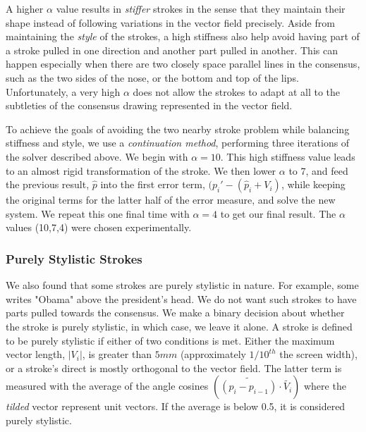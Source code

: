 A higher $\alpha$ value results in {\em stiffer} strokes in the sense that they maintain their shape instead of following variations in the vector field precisely. Aside from maintaining the {\em style} of the strokes, a high stiffness also help avoid having part of a stroke pulled in one direction and another part pulled in another. This can happen especially when there are two closely space parallel lines in the consensus, such as the two sides of the nose, or the bottom and top of the lips. Unfortunately, a very high $\alpha$ does not allow the strokes to adapt at all to the subtleties of the consensus drawing represented in the vector field.

To achieve the goals of avoiding the two nearby stroke problem while balancing stiffness and style, we use a {\em continuation method}, performing three iterations of the solver described above. We begin with $\alpha=10$. This high stiffness value leads to an almost rigid transformation of the stroke. We then lower $\alpha$ to 7, and feed the previous result, $\hat{p}$ into the first error term, $(p_i' - (\hat{p}_i + V_i)$, while keeping the original terms for the latter half of the error measure, and solve the new system. We repeat this one final time with $\alpha=4$ to get our final result. The $\alpha$ values (10,7,4) were chosen experimentally.

\subsubsection{Purely Stylistic Strokes}

We also found that some strokes are purely stylistic in nature. For example, some writes "Obama" above the president's head. We do not want such strokes to have parts pulled towards the consensus. We make a binary decision about whether the stroke is purely stylistic, in which case, we leave it alone. A stroke is defined to be purely stylistic if either of two conditions is met. Either the maximum vector length, $|V_i|$, is greater than $5mm$ (approximately $1/10^{th}$ the screen width), or a stroke's direct is mostly orthogonal to the vector field. The latter term is measured with the average of the angle cosines $(\tilde{(p_i - p_{i-1})} \cdot \tilde{V_i})$ where the {\em tilded} vector represent unit vectors. If the average is below 0.5, it is considered purely stylistic.





